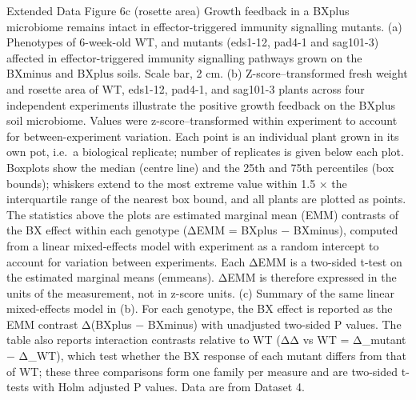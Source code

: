 \documentclass[
  10pt,
]{article}
\begin{document}
Extended Data Figure 6c (rosette area) \textbar{} Growth feedback in a
BXplus microbiome remains intact in effector-triggered immunity
signalling mutants. (a) Phenotypes of 6-week-old WT, and mutants
(eds1-12, pad4-1 and sag101-3) affected in effector-triggered immunity
signalling pathways grown on the BXminus and BXplus soils. Scale bar, 2
cm. (b) Z-score--transformed fresh weight and rosette area of WT,
eds1-12, pad4-1, and sag101-3 plants across four independent experiments
illustrate the positive growth feedback on the BXplus soil microbiome.
Values were z-score--transformed within experiment to account for
between-experiment variation. Each point is an individual plant grown in
its own pot, i.e.~a biological replicate; number of replicates is given
below each plot. Boxplots show the median (centre line) and the 25th and
75th percentiles (box bounds); whiskers extend to the most extreme value
within 1.5 × the interquartile range of the nearest box bound, and all
plants are plotted as points. The statistics above the plots are
estimated marginal mean (EMM) contrasts of the BX effect within each
genotype (ΔEMM = BXplus − BXminus), computed from a linear mixed-effects
model with experiment as a random intercept to account for variation
between experiments. Each ΔEMM is a two-sided t-test on the estimated
marginal means (emmeans). ΔEMM is therefore expressed in the units of
the measurement, not in z-score units. (c) Summary of the same linear
mixed-effects model in (b). For each genotype, the BX effect is reported
as the EMM contrast Δ(BXplus − BXminus) with unadjusted two-sided P
values. The table also reports interaction contrasts relative to WT (ΔΔ
vs WT = Δ\_mutant − Δ\_WT), which test whether the BX response of each
mutant differs from that of WT; these three comparisons form one family
per measure and are two-sided t-tests with Holm adjusted P values. Data
are from Dataset 4.
\end{document}
